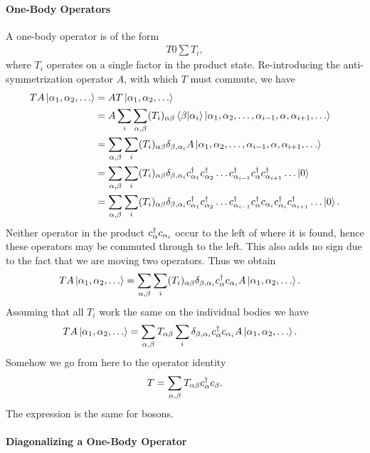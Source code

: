 \paragraph{One-Body Operators}
A one-body operator is of the form
\begin{align*}
	T 0 \sum T_{i},
\end{align*}
where $T_{i}$ operates on a single factor in the product state. Re-introducing the anti-symmetrization operator $A$, with which $T$ must commute, we have
\begin{align*}
	TA\ket{\alpha_{1}, \alpha_{2}, \dots} &= AT\ket{\alpha_{1}, \alpha_{2}, \dots} \\
	                                      &= A\sum\limits_{i}\sum\limits_{\alpha, \beta}(T_{i})_{\alpha\beta}\braket{\beta}{\alpha_{i}}\ket{\alpha_{1}, \alpha_{2}, \dots, \alpha_{i - 1}, \alpha, \alpha_{i + 1}, \dots} \\
	                                      &= \sum\limits_{\alpha, \beta}\sum\limits_{i}(T_{i})_{\alpha\beta}\delta_{\beta, \alpha_{i}}A\ket{\alpha_{1}, \alpha_{2}, \dots, \alpha_{i - 1}, \alpha, \alpha_{i + 1}, \dots} \\
	                                      &= \sum\limits_{\alpha, \beta}\sum\limits_{i}(T_{i})_{\alpha\beta}\delta_{\beta, \alpha_{i}}c_{\alpha_{1}}^{\dagger}c_{\alpha_{2}}^{\dagger}\dots c_{\alpha_{i - 1}}^{\dagger}c_{\alpha}^{\dagger}c_{\alpha_{i + 1}}^{\dagger}\dots\ket{0} \\
	                                      &= \sum\limits_{\alpha, \beta}\sum\limits_{i}(T_{i})_{\alpha\beta}\delta_{\beta, \alpha_{i}}c_{\alpha_{1}}^{\dagger}c_{\alpha_{2}}^{\dagger}\dots c_{\alpha_{i - 1}}^{\dagger}c_{\alpha}^{\dagger}c_{\alpha_{i}}c_{\alpha_{i}}^{\dagger}c_{\alpha_{i + 1}}^{\dagger}\dots\ket{0}.
\end{align*}
Neither operator in the product $c_{\alpha}^{\dagger}c_{\alpha_{i}}$ occur to the left of where it is found, hence these operators may be commuted through to the left. This also adds no sign due to the fact that we are moving two operators. Thus we obtain
\begin{align*}
	TA\ket{\alpha_{1}, \alpha_{2}, \dots} &= \sum\limits_{\alpha, \beta}\sum\limits_{i}(T_{i})_{\alpha\beta}\delta_{\beta, \alpha_{i}}c_{\alpha}^{\dagger}c_{\alpha_{i}}A\ket{\alpha_{1}, \alpha_{2}, \dots}.
\end{align*}
Assuming that all $T_{i}$ work the same on the individual bodies we have
\begin{align*}
	TA\ket{\alpha_{1}, \alpha_{2}, \dots} &= \sum\limits_{\alpha, \beta}T_{\alpha\beta}\sum\limits_{i}\delta_{\beta, \alpha_{i}}c_{\alpha}^{\dagger}c_{\alpha_{i}}A\ket{\alpha_{1}, \alpha_{2}, \dots}.
\end{align*}
Somehow we go from here to the operator identity
\begin{align*}
	T = \sum\limits_{\alpha, \beta}T_{\alpha\beta}c_{\alpha}^{\dagger}c_{\beta}.
\end{align*}
The expression is the same for bosons.

\paragraph{Diagonalizing a One-Body Operator}